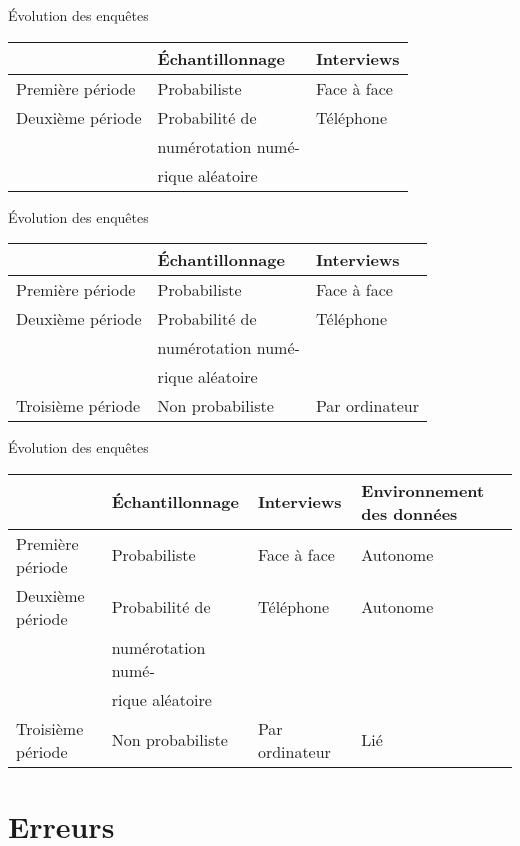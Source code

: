 \documentclass[
  ignorenonframetext,
]{beamer}
\begin{document}
\begin{frame}{Évolution des enquêtes}
\protect\hypertarget{uxe9volution-des-enquuxeates-1}{}

\begin{longtable}[]{@{}lll@{}}
\toprule
& Échantillonnage & Interviews\tabularnewline
\midrule
\endhead
Première période & Probabiliste & Face à face\tabularnewline
Deuxième période & Probabilité de & Téléphone\tabularnewline
& numérotation numé- &\tabularnewline
& rique aléatoire &\tabularnewline
\bottomrule
\end{longtable}

\end{frame}

\begin{frame}{Évolution des enquêtes}
\protect\hypertarget{uxe9volution-des-enquuxeates-2}{}

\begin{longtable}[]{@{}lll@{}}
\toprule
& Échantillonnage & Interviews\tabularnewline
\midrule
\endhead
Première période & Probabiliste & Face à face\tabularnewline
Deuxième période & Probabilité de & Téléphone\tabularnewline
& numérotation numé- &\tabularnewline
& rique aléatoire &\tabularnewline
Troisième période & Non probabiliste & Par ordinateur\tabularnewline
\bottomrule
\end{longtable}

\end{frame}

\begin{frame}{Évolution des enquêtes}
\protect\hypertarget{uxe9volution-des-enquuxeates-3}{}

\begin{longtable}[]{@{}llll@{}}
\toprule
& Échantillonnage & Interviews & Environnement des
données\tabularnewline
\midrule
\endhead
Première période & Probabiliste & Face à face & Autonome\tabularnewline
Deuxième période & Probabilité de & Téléphone & Autonome\tabularnewline
& numérotation numé- & &\tabularnewline
& rique aléatoire & &\tabularnewline
Troisième période & Non probabiliste & Par ordinateur &
Lié\tabularnewline
\bottomrule
\end{longtable}

\end{frame}

\hypertarget{erreurs}{%
\section{Erreurs}\label{erreurs}}
\end{document}
